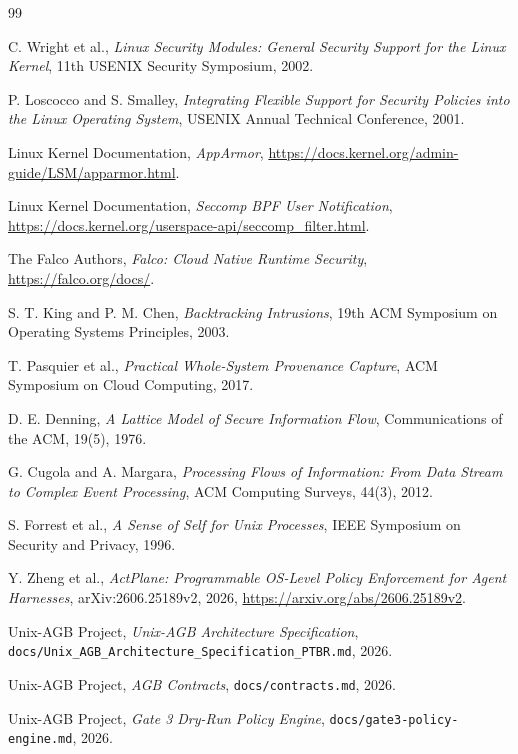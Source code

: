 \documentclass[11pt,a4paper]{article}
\begin{document}
\begin{thebibliography}{99}

C. Wright et al.,
\emph{Linux Security Modules: General Security Support for the Linux Kernel},
11th USENIX Security Symposium, 2002.

P. Loscocco and S. Smalley,
\emph{Integrating Flexible Support for Security Policies into the Linux
Operating System}, USENIX Annual Technical Conference, 2001.

Linux Kernel Documentation,
\emph{AppArmor}, \url{https://docs.kernel.org/admin-guide/LSM/apparmor.html}.

Linux Kernel Documentation,
\emph{Seccomp BPF User Notification},
\url{https://docs.kernel.org/userspace-api/seccomp_filter.html}.

The Falco Authors,
\emph{Falco: Cloud Native Runtime Security}, \url{https://falco.org/docs/}.

S. T. King and P. M. Chen,
\emph{Backtracking Intrusions}, 19th ACM Symposium on Operating Systems
Principles, 2003.

T. Pasquier et al.,
\emph{Practical Whole-System Provenance Capture}, ACM Symposium on Cloud
Computing, 2017.

D. E. Denning,
\emph{A Lattice Model of Secure Information Flow}, Communications of the ACM,
19(5), 1976.

G. Cugola and A. Margara,
\emph{Processing Flows of Information: From Data Stream to Complex Event
Processing}, ACM Computing Surveys, 44(3), 2012.

S. Forrest et al.,
\emph{A Sense of Self for Unix Processes}, IEEE Symposium on Security and
Privacy, 1996.

Y. Zheng et al.,
\emph{ActPlane: Programmable OS-Level Policy Enforcement for Agent Harnesses},
arXiv:2606.25189v2, 2026,
\url{https://arxiv.org/abs/2606.25189v2}.

Unix-AGB Project,
\emph{Unix-AGB Architecture Specification},
\texttt{docs/Unix\_AGB\_Architecture\_Specification\_PTBR.md}, 2026.

Unix-AGB Project,
\emph{AGB Contracts},
\texttt{docs/contracts.md}, 2026.

Unix-AGB Project,
\emph{Gate 3 Dry-Run Policy Engine},
\texttt{docs/gate3-policy-engine.md}, 2026.


\end{thebibliography}
\end{document}
